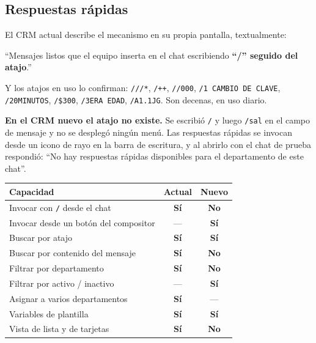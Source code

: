 \documentclass[11pt,a4paper]{article}
\newcommand{\cod}[1]{\texttt{\small #1}}
\newcommand{\si}{\textcolor{ok}{\textbf{Sí}}}
\newcommand{\no}{\textcolor{warn}{\textbf{No}}}
\begin{document}
\subsection{Respuestas rápidas}

El CRM actual describe el mecanismo en su propia pantalla, textualmente:

\begin{nota}
``Mensajes listos que el equipo inserta en el chat escribiendo \textbf{``/'' seguido
del atajo}.''
\end{nota}

Y los atajos en uso lo confirman: \cod{///*}, \cod{/++}, \cod{//000},
\cod{/1 CAMBIO DE CLAVE}, \cod{/20MINUTOS}, \cod{/\$300}, \cod{/3ERA EDAD},
\cod{/A1.1JG}. Son decenas, en uso diario.

\textbf{En el CRM nuevo el atajo no existe.} Se escribió \cod{/} y luego \cod{/sal} en
el campo de mensaje y no se desplegó ningún menú. Las respuestas rápidas se invocan
desde un icono de rayo en la barra de escritura, y al abrirlo con el chat de prueba
respondió: ``No hay respuestas rápidas disponibles para el departamento de este chat''.

\begin{center}
\begin{tabularx}{\textwidth}{@{}Lcc@{}}
\toprule
\textbf{Capacidad} & \textbf{Actual} & \textbf{Nuevo} \\
\midrule
Invocar con \cod{/} desde el chat        & \si & \no \\
Invocar desde un botón del compositor    & --- & \si \\
Buscar por atajo                         & \si & \si \\
Buscar por contenido del mensaje         & \si & \no \\
Filtrar por departamento                 & \si & \no \\
Filtrar por activo / inactivo            & --- & \si \\
Asignar a varios departamentos           & \si & --- \\
Variables de plantilla                   & \si & \si \\
Vista de lista y de tarjetas             & \si & \no \\
\bottomrule
\end{tabularx}
\end{center}
\end{document}
